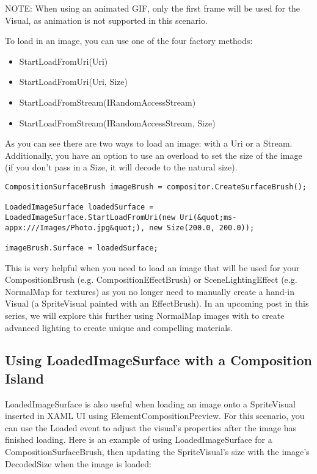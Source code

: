 NOTE: When using an animated GIF, only the first frame will be used for the Visual, as animation is not supported in this scenario.

To load in an image, you can use one of the four factory methods:

\begin{itemize}
	\item StartLoadFromUri(Uri)
	\item StartLoadFromUri(Uri, Size)
	\item StartLoadFromStream(IRandomAccessStream)
	\item StartLoadFromStream(IRandomAccessStream, Size)
\end{itemize}

As you can see there are two ways to load an image: with a Uri or a Stream. Additionally, you have an option to use an overload to set the size of the image (if you don’t pass in a Size, it will decode to the natural size).



\begin{lstlisting}[style=CSharpStyle]
CompositionSurfaceBrush imageBrush = compositor.CreateSurfaceBrush();

LoadedImageSurface loadedSurface = LoadedImageSurface.StartLoadFromUri(new Uri(&quot;ms-appx:///Images/Photo.jpg&quot;), new Size(200.0, 200.0));

imageBrush.Surface = loadedSurface;
\end{lstlisting}

This is very helpful when you need to load an image that will be used for your CompositionBrush (e.g. CompositionEffectBrush) or SceneLightingEffect (e.g. NormalMap for textures) as you no longer need to manually create a hand-in Visual (a SpriteVisual painted with an EffectBrush). In an upcoming post in this series, we will explore this further using NormalMap images with to create advanced lighting to create unique and compelling materials.

\subsection{Using LoadedImageSurface with a Composition Island}

LoadedImageSurface is also useful when loading an image onto a SpriteVisual inserted in XAML UI using ElementCompositionPreview. For this scenario, you can use the Loaded event to adjust the visual’s properties after the image has finished loading.
Here is an example of using LoadedImageSurface for a CompositionSurfaceBrush, then updating the SpriteVisual’s size with the image’s DecodedSize when the image is loaded:

